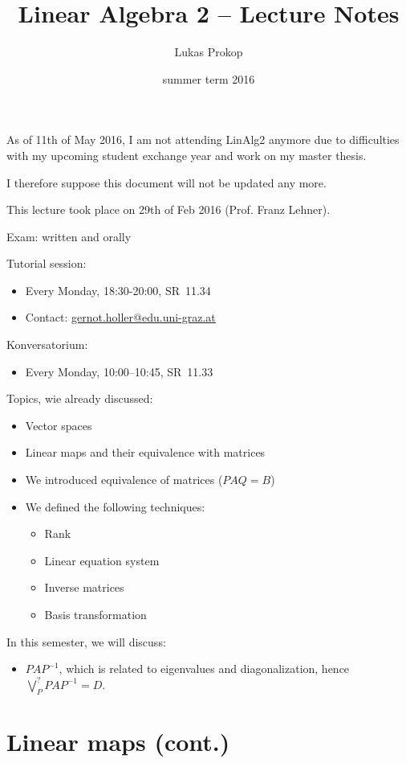 \documentclass[a4paper,landscape,twocolumn]{article}
\title{Linear Algebra 2 -- Lecture Notes}
\author{Lukas Prokop}
\date{summer term 2016}
\newcommand\meta[3]{This #1 took place on #2 (#3).\par}
\theoremstyle{definition}
\begin{document}
{\Huge
  As of 11th of May 2016,
  I am not attending LinAlg2
  anymore due to difficulties
  with my upcoming student exchange year
  and work on my master thesis.

  I therefore suppose this document will not be updated any more.
}
\newpage

\maketitle
\tableofcontents
\meta{lecture}{29th of Feb 2016}{Prof. Franz Lehner}

Exam: written and orally

Tutorial session:
\begin{itemize}
  \item Every Monday, 18:30-20:00, SR~11.34
  \item Contact: \href{mailto:gernot.holler@edu.uni-graz.at}{gernot.holler@edu.uni-graz.at}
\end{itemize}
Konversatorium:
\begin{itemize}
  \item Every Monday, 10:00--10:45, SR~11.33
\end{itemize}

Topics, wie already discussed:
\begin{itemize}
  \item Vector spaces
  \item Linear maps and their equivalence with matrices
  \item We introduced equivalence of matrices ($PAQ = B$)
  \item We defined the following techniques:
    \begin{itemize}
      \item Rank
      \item Linear equation system
      \item Inverse matrices
      \item Basis transformation
    \end{itemize}
\end{itemize}

In this semester, we will discuss:
\begin{itemize}
  \item
    $PAP^{-1}$, which is related to eigenvalues and diagonalization,
    hence $\bigvee_{P}^? PAP^{-1} = D$.
\end{itemize}

\clearpage
\section{Linear maps (cont.)}
\end{document}
